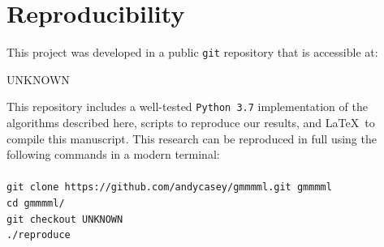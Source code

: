 \documentclass{elsarticle}
\newcommand{\giturl}{UNKNOWN}
\newcommand{\githash}{UNKNOWN}
\newcommand{\nbb}[2]{
    \fcolorbox{black}{cyan}{\bfseries\sffamily\scriptsize#1}
    {\sf$\blacktriangleright$\textcolor{blue}{\textit{#2}}$\blacktriangleleft$}
}
\newcommand{\andy}[1]{\nbb{Andy}{#1}}
\newcommand{\vect}[1]{\boldsymbol{\mathbf{#1}}}
\renewcommand{\vec}[1]{\vect{#1}}
\def\cov{C}
\def\weight{w}
\newcommand{\bashcommand}[1]{\noindent\texttt{#1}\\}
\begin{document}

\section{Reproducibility} \label{sec:reproducibility}

\noindent{}This project was developed in a public \texttt{git} repository that is 
accessible at:
\begin{center}
\giturl
\end{center}
\noindent{}This repository includes a well-tested \texttt{Python 3.7} implementation
of the algorithms described here, scripts to reproduce our results, and \LaTeX\ to compile this manuscript. This research can be reproduced in full using
the following commands in a modern terminal:\\\\
\bashcommand{git clone https://github.com/andycasey/gmmmml.git gmmmml}
\bashcommand{cd gmmmml/}
\bashcommand{git checkout \githash}
\bashcommand{./reproduce}
\end{document}
